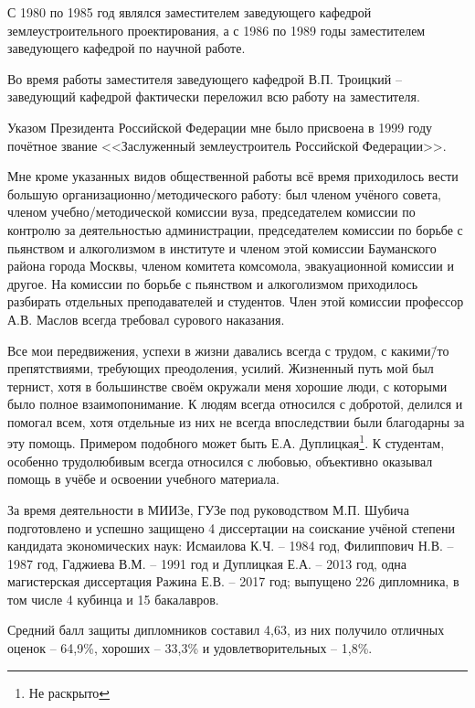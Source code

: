 С 1980 по 1985 год являлся заместителем заведующего кафедрой землеустроительного проектирования, а с 1986 по 1989 годы заместителем заведующего кафедрой по научной работе.

Во время работы заместителя заведующего кафедрой В.П. Троицкий \--- заведующий кафедрой фактически переложил всю работу на заместителя.

Указом Президента Российской Федерации мне было присвоена в 1999 году почётное звание <<Заслуженный землеустроитель Российской Федерации>>. 

Мне кроме указанных видов общественной работы всё время приходилось вести большую организационно\-/методического работу: был членом учёного совета, членом учебно\-/методической комиссии вуза, председателем комиссии по контролю за деятельностью администрации, председателем комиссии по борьбе с пьянством и алкоголизмом в институте и членом этой комиссии Бауманского района города Москвы, членом комитета комсомола, эвакуационной комиссии и другое. На комиссии по борьбе с пьянством и алкоголизмом приходилось разбирать отдельных преподавателей и студентов. Член этой комиссии профессор А.В. Маслов всегда требовал сурового наказания.

Все мои передвижения, успехи в жизни давались всегда с трудом, с какими\=/то препятствиями, требующих преодоления, усилий. Жизненный путь мой был тернист, хотя в большинстве своём окружали меня хорошие люди, с которыми было полное взаимопонимание. К людям всегда относился с добротой, делился и помогал всем, хотя отдельные из них не всегда впоследствии были благодарны за эту помощь. Примером подобного может быть Е.А. Дуплицкая\footnote{Не раскрыто}. К студентам, особенно трудолюбивым всегда относился с любовью, объективно оказывал помощь в учёбе и освоении учебного материала.

За время деятельности в МИИЗе, ГУЗе под руководством М.П. Шубича подготовлено и успешно защищено 4 диссертации на соискание учёной степени кандидата экономических наук: Исмаилова К.Ч. \--- 1984 год, Филиппович Н.В. \--- 1987 год, Гаджиева В.М. \--- 1991 год и Дуплицкая Е.А. \--- 2013 год, одна магистерская диссертация Ражина Е.В. \--- 2017 год; выпущено 226 дипломника, в том числе 4 кубинца и 15 бакалавров.

Средний балл защиты дипломников составил 4,63, из них получило отличных оценок \--- 64,9\%, хороших \--- 33,3\% и удовлетворительных \--- 1,8\%.

